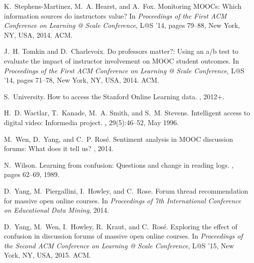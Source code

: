 \documentclass{edm_template}
\begin{document}
\begin{thebibliography}{10}
K.~Stephens-Martinez, M.~A. Hearst, and A.~Fox.
\newblock Monitoring {MOOC}s: Which information sources do instructors value?
\newblock In {\em Proceedings of the First ACM Conference on Learning @ Scale
  Conference}, L@S '14, pages 79--88, New York, NY, USA, 2014. ACM.

J.~H. Tomkin and D.~Charlevoix.
\newblock Do professors matter?: Using an a/b test to evaluate the impact of
  instructor involvement on {MOOC} student outcomes.
\newblock In {\em Proceedings of the First ACM Conference on Learning @ Scale
  Conference}, L@S '14, pages 71--78, New York, NY, USA, 2014. ACM.

S.~University.
\newblock How to access the Stanford Online Learning data.
, 2012+.

H.~D. Wactlar, T.~Kanade, M.~A. Smith, and S.~M. Stevens.
\newblock Intelligent access to digital video: Informedia project.
, 29(5):46--52, May 1996.

M.~Wen, D.~Yang, and C.~P. Ros{\'e}.
\newblock Sentiment analysis in {MOOC} discussion forums: What does it tell us?
, 2014.

N.~Wilson.
\newblock Learning from confusion: Questions and change in reading logs.
, pages 62--69, 1989.

D.~Yang, M.~Piergallini, I.~Howley, and C.~Rose.
\newblock Forum thread recommendation for massive open online courses.
\newblock In {\em Proceedings of 7th International Conference on Educational
  Data Mining}, 2014.

D.~Yang, M.~Wen, I.~Howley, R.~Kraut, and C.~Ros{\'e}.
\newblock Exploring the effect of confusion in discussion forums of massive
  open online courses.
\newblock In {\em Proceedings of the Second ACM Conference on Learning @ Scale
  Conference}, L@S '15, New York, NY, USA, 2015. ACM.
  
\end{thebibliography}
\balancecolumns
\end{document}
